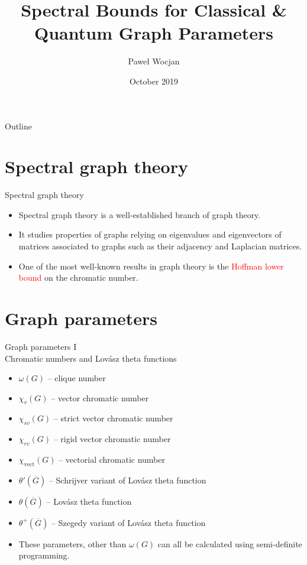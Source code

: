 \documentclass{beamer}
\title[Spectral Bounds]{Spectral Bounds for Classical \& Quantum Graph Parameters}
\author{Pawe{\l} Wocjan}
\institute{University of Central Florida}
\date{October 2019}
\renewcommand{\>}{\rangle}
\newcommand{\<}{\langle}
\begin{document}
\begin{frame}
  \titlepage
\end{frame}

\begin{frame}{Outline}
  \tableofcontents
\end{frame}

\section{Spectral graph theory}

\begin{frame}{Spectral graph theory}
\begin{itemize}
\item Spectral graph theory is a well-established branch of graph theory.

\item It studies properties of graphs relying on eigenvalues and eigenvectors of matrices associated to graphs such as their adjacency and Laplacian matrices.

\item One of the most well-known results in graph theory is the \textcolor{red}{Hoffman lower bound} on the chromatic number.
\end{itemize}
\end{frame}

\section{Graph parameters}

\begin{frame}{Graph parameters I \\ Chromatic numbers and Lov\'asz theta functions}
\begin{itemize}
\item $\omega(G)$ -- clique number
\item $\chi_v(G)$ -- vector chromatic number
\item $\chi_{sv}(G)$ -- strict vector chromatic number
\item $\chi_{rv}(G)$ -- rigid vector chromatic number
\item $\chi_{\mathrm{vect}}(G)$ -- vectorial chromatic number

\medskip
\item $\theta'(\overline{G})$  -- Schrijver variant of Lov\'asz theta function
\item $\theta(\overline{G})$ -- Lov\'asz theta function 
\item $\theta^+(\overline{G})$ -- Szegedy variant of Lov\'asz theta function 

\medskip
\item These parameters, other than $\omega(G)$ can all be calculated using semi-definite programming.
\end{itemize}
\end{frame}
\end{document}
